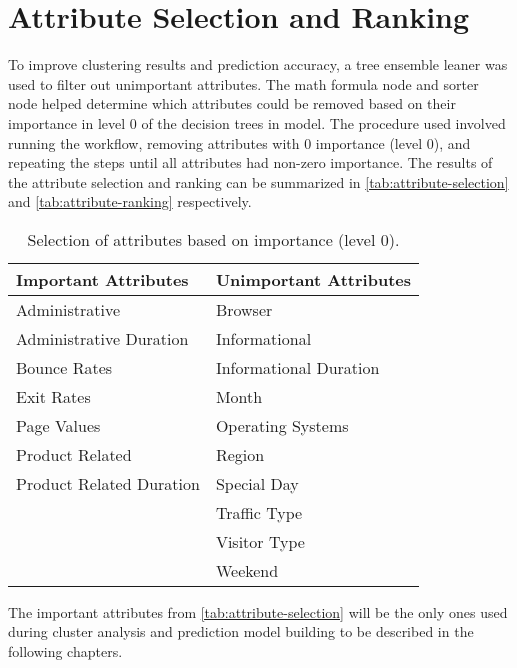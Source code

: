 \documentclass[../cmpe-251-project-report.tex]{subfiles}
\begin{document}
  \chapter{Attribute Selection and Ranking}
  To improve clustering results and prediction accuracy, a tree ensemble leaner was used to filter out unimportant attributes. The math formula node and sorter node helped determine which attributes could be removed based on their importance in level 0 of the decision trees in model. The procedure used involved running the workflow, removing attributes with 0 importance (level 0), and repeating the steps until all attributes had non-zero importance. The results of the attribute selection and ranking can be summarized in \autoref{tab:attribute-selection} and \autoref{tab:attribute-ranking} respectively.
  \begin{table}
    \caption{Selection of attributes based on importance (level 0).}
    \label{tab:attribute-selection}
    \begin{tabular}{ll}
      \toprule
      Important Attributes     & Unimportant Attributes \\
      \midrule
      Administrative           & Browser                \\
      Administrative Duration  & Informational          \\
      Bounce Rates             & Informational Duration \\
      Exit Rates               & Month                  \\
      Page Values              & Operating Systems      \\
      Product Related          & Region                 \\
      Product Related Duration & Special Day            \\
                               & Traffic Type           \\
                               & Visitor Type           \\
                               & Weekend                \\
      \bottomrule
    \end{tabular}
  \end{table}
  The important attributes from \autoref{tab:attribute-selection} will be the only ones used during cluster analysis and prediction model building to be described in the following chapters.
\end{document}

